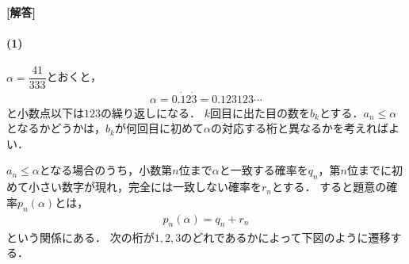 \documentclass[../../main.tex]{subfiles}
\begin{document}
\begin{oframed}
  
\end{oframed}
{\bf [解答]}

\paragraph{(1)}
$\alpha=\dfrac{41}{333}$とおくと，
\begin{align}
  \alpha=0.\dot{1}2\dot{3}=0.123123\cdots
\end{align}
と小数点以下は$123$の繰り返しになる．
$k$回目に出た目の数を$b_k$とする．$a_n\le\alpha$となるかどうかは，$b_k$が何回目に初めて$\alpha$の対応する桁と異なるかを考えればよい．

$a_n\le\alpha$となる場合のうち，小数第$n$位まで$\alpha$と一致する確率を$q_n$，第$n$位までに初めて小さい数字が現れ，完全には一致しない確率を$r_n$とする．
すると題意の確率$p_n(\alpha)$とは，
\begin{align}
  p_n(\alpha)=q_n+r_n \label{eq:1}
\end{align}
という関係にある．
次の桁が$1,2,3$のどれであるかによって下図のように遷移する．
\end{document}
